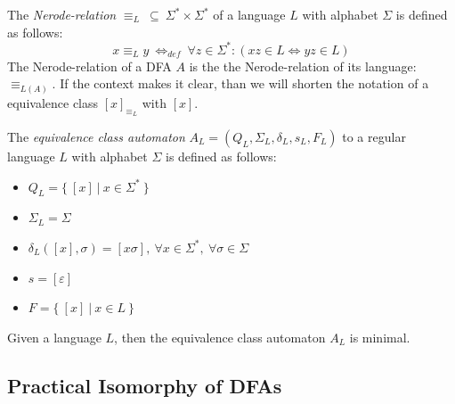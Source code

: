 The \emph{Nerode-relation} $\equiv_L\ \subseteq\ \Sigma^* \times \Sigma^*$ of a language $L$ with alphabet $\Sigma$ is defined as follows:
\begin{displaymath}
	x \equiv_L y\ \Leftrightarrow_{def}\ \forall z\in\Sigma^*\colon (xz\in L \Leftrightarrow yz\in L)
\end{displaymath}
The Nerode-relation of a DFA $A$ is the the Nerode-relation of its language: $\equiv_{L(A)}$. If the context makes it clear, than we will shorten the notation of a equivalence class $[x]_{\equiv_L}$ with $[x]$.

The \emph{equivalence class automaton} $A_L = (Q_L, \Sigma_L, \delta_L, s_L, F_L)$ to a regular language $L$ with alphabet $\Sigma$ is defined as follows:
\begin{itemize}
	\item $Q_L = \{\ [x]\ |\ x \in \Sigma^*\ \}$
	\item $\Sigma_L = \Sigma$
	\item $\delta_L([x], \sigma) = [x\sigma],\ \forall x\in\Sigma^*,\ \forall\sigma\in\Sigma$
	\item $s = [\varepsilon]$
	\item $F = \{\ [x]\ |\ x \in L\ \}$
\end{itemize}
\begin{theorem}
	Given a language $L$, then the equivalence class automaton $A_L$ is minimal.
\end{theorem}

\subsection{Practical Isomorphy of DFAs}

